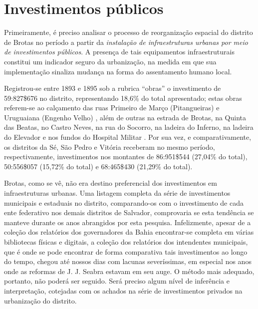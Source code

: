\section{Investimentos públicos}\label{sec:3.1}

Primeiramente, é preciso analisar o processo de reorganização espacial do distrito de Brotas no período a partir da \textit{instalação de infraestruturas urbanas por meio de investimentos públicos}. A presença de tais equipamentos infraestruturais constitui um indicador seguro da urbanização, na medida em que sua implementação sinaliza mudança na forma do assentamento humano local. 

Registrou-se entre 1893 e 1895 sob a rubrica ``obras'' o investimento de 59:827\$676 no distrito, representando 18,6\% do total apresentado; estas obras referem-se ao calçamento das ruas Primeiro de Março (Pitangueiras) e Uruguaiana (Engenho Velho) \cite[pp.~21-23, 138]{salvador_relatorio_1895}, além de outras na estrada de Brotas, na Quinta das Beatas, no Castro Neves, na rua do Socorro, na ladeira do Inferno, na ladeira do Elevador e nos fundos do Hospital Militar \cite[p.~157]{salvador_relatorio_1894}. Por sua vez, e comparativamente, os distritos da Sé, São Pedro e Vitória receberam no mesmo período, respectivamente, investimentos nos montantes de 86:951\$544 (27,04\% do total), 50:556\$057 (15,72\% do total) e 68:465\$430 (21,29\% do total).

Brotas, como se vê, não era destino preferencial dos investimentos em infraestruturas urbanas. Uma listagem completa da série de investimentos municipais e estaduais no distrito, comparando-os com o investimento de cada ente federativo nos demais distritos de Salvador, comprovaria se esta tendência se manteve durante os anos abrangidos por esta pesquisa. Infelizmente, apesar de a coleção dos relatórios dos governadores da Bahia encontrar-se completa em várias bibliotecas físicas e digitais, a coleção dos relatórios dos intendentes municipais, que é onde se pode encontrar de forma comparativa tais investimentos ao longo do tempo, chegou até nossos dias com lacunas severíssimas, em especial nos anos onde as reformas de J. J. Seabra estavam em seu auge. O método mais adequado, portanto, não poderá ser seguido. Será preciso algum nível de inferência e interpretação, cotejadas com os achados na série de investimentos privados na urbanização do distrito. 

